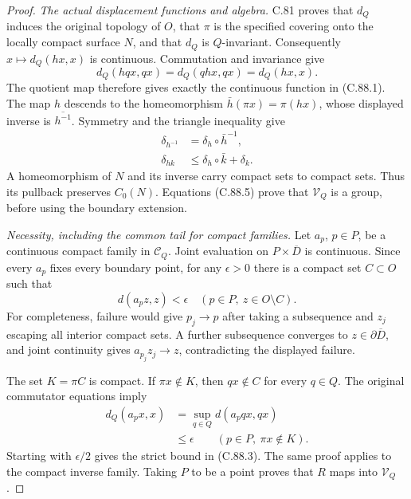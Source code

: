 \begin{proof}
\emph{The actual displacement functions and algebra.}
C.81 proves that $d_Q$ induces the original
topology of $O$, that $\pi$ is the specified
covering onto the locally compact surface
$N$, and that $d_Q$ is $Q$-invariant.
Consequently $x\mapsto d_Q(hx,x)$ is
continuous. Commutation and invariance give
\[
 d_Q(hqx,qx)=d_Q(qhx,qx)=d_Q(hx,x).
                                                                  \tag{C.88.4}
\]
The quotient map therefore gives exactly
the continuous function in (C.88.1).
The map $h$ descends to the homeomorphism
$\bar h(\pi x)=\pi(hx)$, whose displayed
inverse is $\overline{h^{-1}}$.
Symmetry and the triangle inequality give
\[
 \begin{split}
 \delta_{h^{-1}}&=\delta_h\circ\bar h^{-1},\\
 \delta_{hk}&\leq\delta_h\circ\bar k+\delta_k .
 \end{split}                                                   \tag{C.88.5}
\]
A homeomorphism of $N$ and its inverse
carry compact sets to compact sets.
Thus its pullback preserves $C_0(N)$.
Equations (C.88.5) prove that
$\mathscr V_Q$ is a group, before using
the boundary extension.

\emph{Necessity, including the common tail for compact families.}
Let $a_p$, $p\in P$, be a continuous compact
family in $\mathscr C_Q$. Joint evaluation
on $P\times\overline D$ is continuous.
Since every $a_p$ fixes every boundary
point, for any $\epsilon>0$ there is a
compact set $C\subset O$ such that
\[
          d(a_p z,z)<\epsilon
                \quad(p\in P,\ z\in O\setminus C).             \tag{C.88.6}
\]
For completeness, failure would give
$p_j\to p$ after taking a subsequence
and $z_j$ escaping all interior compact
sets. A further subsequence converges
to $z\in\partial\overline D$, and joint
continuity gives $a_{p_j}z_j\to z$,
contradicting the displayed failure.

The set $K=\pi C$ is compact. If
$\pi x\notin K$, then $qx\notin C$
for every $q\in Q$. The original
commutator equations imply
\[
 \begin{split}
 d_Q(a_p x,x)
   &=\sup_{q\in Q}d(a_p qx,qx)\\
   &\leq\epsilon
       \qquad(p\in P,\ \pi x\notin K).
 \end{split}                                                   \tag{C.88.7}
\]
Starting with $\epsilon/2$ gives the
strict bound in (C.88.3).
The same proof applies to the compact
inverse family. Taking $P$ to be a
point proves that $R$ maps into
$\mathscr V_Q$.


\end{proof}

